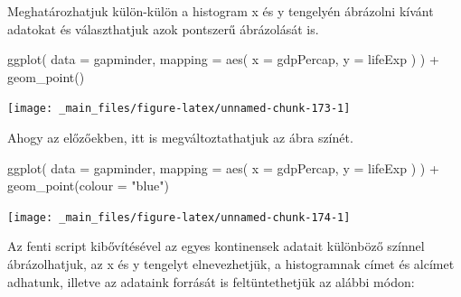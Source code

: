 \documentclass[
]{book}
\newenvironment{Shaded}{\begin{snugshade}}{\end{snugshade}}
\newcommand{\AttributeTok}[1]{\textcolor[rgb]{0.77,0.63,0.00}{#1}}
\newcommand{\FunctionTok}[1]{\textcolor[rgb]{0.00,0.00,0.00}{#1}}
\newcommand{\NormalTok}[1]{#1}
\newcommand{\SpecialCharTok}[1]{\textcolor[rgb]{0.00,0.00,0.00}{#1}}
\newcommand{\StringTok}[1]{\textcolor[rgb]{0.31,0.60,0.02}{#1}}
\begin{document}
Meghatározhatjuk külön-külön a histogram x és y tengelyén ábrázolni
kívánt adatokat és választhatjuk azok pontszerű ábrázolását is.

\begin{Shaded}
\begin{Highlighting}[]
\FunctionTok{ggplot}\NormalTok{(}
  \AttributeTok{data =}\NormalTok{ gapminder,}
  \AttributeTok{mapping =} \FunctionTok{aes}\NormalTok{(}
    \AttributeTok{x =}\NormalTok{ gdpPercap,}
    \AttributeTok{y =}\NormalTok{ lifeExp}
\NormalTok{  )}
\NormalTok{) }\SpecialCharTok{+}
  \FunctionTok{geom\_point}\NormalTok{() }
\end{Highlighting}
\end{Shaded}

\begin{center}\texttt{[image: \_main\_files/figure-latex/unnamed-chunk-173-1]} \end{center}

Ahogy az előzőekben, itt is megváltoztathatjuk az ábra színét.

\begin{Shaded}
\begin{Highlighting}[]
\FunctionTok{ggplot}\NormalTok{(}
  \AttributeTok{data =}\NormalTok{ gapminder,}
  \AttributeTok{mapping =} \FunctionTok{aes}\NormalTok{(}
    \AttributeTok{x =}\NormalTok{ gdpPercap,}
    \AttributeTok{y =}\NormalTok{ lifeExp}
\NormalTok{  )}
\NormalTok{) }\SpecialCharTok{+}
  \FunctionTok{geom\_point}\NormalTok{(}\AttributeTok{colour =} \StringTok{"blue"}\NormalTok{)}
\end{Highlighting}
\end{Shaded}

\begin{center}\texttt{[image: \_main\_files/figure-latex/unnamed-chunk-174-1]} \end{center}

Az fenti script kibővítésével az egyes kontinensek adatait különböző
színnel ábrázolhatjuk, az x és y tengelyt elnevezhetjük, a histogramnak
címet és alcímet adhatunk, illetve az adataink forrását is
feltüntethetjük az alábbi módon:

\begin{Shaded}
\end{Shaded}
\end{document}
